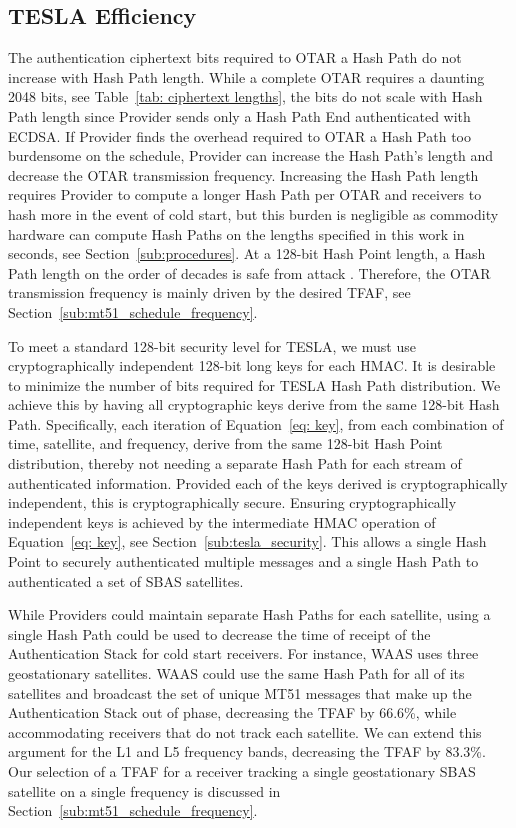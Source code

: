 \documentclass[letterpaper,times]{IONconf/IONconf}
\begin{document}
	\subsection{TESLA Efficiency} \label{sub:tesla_efficiency}

		The authentication ciphertext bits required to OTAR a Hash Path do not increase with Hash Path length.
		While a complete OTAR requires a daunting 2048 bits, see Table~\ref{tab: ciphertext lengths}, the bits do not scale with Hash Path length since Provider sends only a Hash Path End authenticated with ECDSA.
		If Provider finds the overhead required to OTAR a Hash Path too burdensome on the schedule, Provider can increase the Hash Path's length and decrease the OTAR transmission frequency.
		Increasing the Hash Path length requires Provider to compute a longer Hash Path per OTAR and receivers to hash more in the event of cold start, but this burden is negligible as commodity hardware can compute Hash Paths on the lengths specified in this work in seconds, see Section~\ref{sub:procedures}.
		At a 128-bit Hash Point length, a Hash Path length on the order of decades is safe from attack \cite{Neish_Dissertation}.
		Therefore, the OTAR transmission frequency is mainly driven by the desired TFAF, see Section~\ref{sub:mt51_schedule_frequency}.

		To meet a standard 128-bit security level for TESLA, we must use cryptographically independent 128-bit long keys for each HMAC.
		It is desirable to minimize the number of bits required for TESLA Hash Path distribution.
		We achieve this by having all cryptographic keys derive from the same 128-bit Hash Path.
		Specifically, each iteration of Equation~\eqref{eq: key}, from each combination of time, satellite, and frequency, derive from the same 128-bit Hash Point distribution, thereby not needing a separate Hash Path for each stream of authenticated information.
		Provided each of the keys derived is cryptographically independent, this is cryptographically secure.
		Ensuring cryptographically independent keys is achieved by the intermediate HMAC operation of Equation~\eqref{eq: key}, see Section~\ref{sub:tesla_security}.
		This allows a single Hash Point to securely authenticated multiple messages and a single Hash Path to authenticated a set of SBAS satellites.

		While Providers could maintain separate Hash Paths for each satellite, using a single Hash Path could be used to decrease the time of receipt of the Authentication Stack for cold start receivers.
		For instance, WAAS uses three geostationary satellites.
		WAAS could use the same Hash Path for all of its satellites and broadcast the set of unique MT51 messages that make up the Authentication Stack out of phase, decreasing the TFAF by 66.6\%, while accommodating receivers that do not track each satellite.
		We can extend this argument for the L1 and L5 frequency bands, decreasing the TFAF by 83.3\%.
		Our selection of a TFAF for a receiver tracking a single geostationary SBAS satellite on a single frequency is discussed in Section~\ref{sub:mt51_schedule_frequency}.
\end{document}
